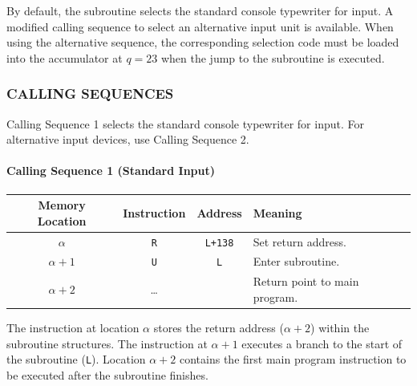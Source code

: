 By default, the subroutine selects the standard console typewriter for input. A modified calling sequence to select an alternative input unit is available. When using the alternative sequence, the corresponding selection code must be loaded into the accumulator at $q = 23$ when the jump to the subroutine is executed.

\subsubsection*{CALLING SEQUENCES}
Calling Sequence 1 selects the standard console typewriter for input. For alternative input devices, use Calling Sequence 2.

\paragraph{Calling Sequence 1 (Standard Input)}
\begin{table}[h!]
\centering
\begin{tabularx}{\textwidth}{cccX}
\toprule
\textbf{Memory Location} & \textbf{Instruction} & \textbf{Address} & \textbf{Meaning} \\
\midrule
$\alpha$   & \texttt{R} & \texttt{L+138} & Set return address. \\
$\alpha+1$ & \texttt{U} & \texttt{L}     & Enter subroutine. \\
$\alpha+2$ & \dots      &                & Return point to main program. \\
\bottomrule
\end{tabularx}
\end{table}
The instruction at location $\alpha$ stores the return address ($\alpha+2$) within the subroutine structures. The instruction at $\alpha+1$ executes a branch to the start of the subroutine (\texttt{L}). Location $\alpha+2$ contains the first main program instruction to be executed after the subroutine finishes.

